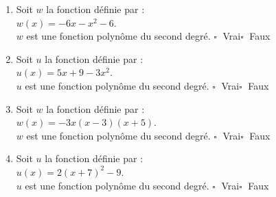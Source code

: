 \begin{multicols}{2}
\begin{enumerate}[itemsep=1em]
	\item \begin{minipage}[t]{\linewidth} Soit $w$ la fonction définie  par :\\
            $w(x)=-6x-x^2-6$. \\
            $w$ est une fonction polynôme du second degré.	$\square\;$ Vrai\qquad $\square\;$ Faux\qquad  \end{minipage}
	\item \begin{minipage}[t]{\linewidth} Soit $u$ la fonction définie  par :\\
            $u(x)=5x+9-3x^2$. \\
            $u$ est une fonction polynôme du second degré.	$\square\;$ Vrai\qquad $\square\;$ Faux\qquad  \end{minipage}
	\item \begin{minipage}[t]{\linewidth} Soit $w$ la fonction définie  par :\\
                    $w(x)=-3x(x-3)(x+5)$. \\          
                    $w$ est une fonction polynôme du second degré.	$\square\;$ Vrai\qquad $\square\;$ Faux\qquad  \end{minipage}
	\item \begin{minipage}[t]{\linewidth} Soit $u$ la fonction définie  par :\\
                  $u(x)=2(x+7)^2-9$. \\         
                  $u$ est une fonction polynôme du second degré.	$\square\;$ Vrai\qquad $\square\;$ Faux\qquad  \end{minipage}
\end{enumerate}
\end{multicols}
